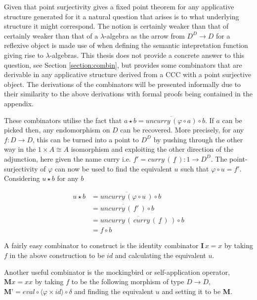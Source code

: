 Given that point surjectivity gives a fixed point theorem for any applicative
structure generated for it a natural question that arises is to what underlying
structure it might correspond. The notion is certainly weaker than that of
certainly weaker than that of a $\lambda$-algebra as the arrow from $D^{D}
\rightarrow D$ for a reflexive object is made use of when defining the semantic
intepretation function giving rise to $\lambda$-algebras. This thesis does not
provide a concrete answer to this question, see Section \ref{section:combin},
but provides some combinators that are derivable in any applicative structure
derived from a CCC with a point surjective object. The derivations of the
combinators will be presented informally due to their similarity to the above
derivations with formal proofs being contained in the appendix.

These combinators utilise the fact that $a \star b =
\overline{uncurry \, (\varphi \circ a)} \circ b$. If  $a$ can be picked
then, any endomorphism on $D$ can be recovered. More precisely, for any $f:
D \rightarrow D$, this can be turned into a point to $D^D$ by pushing through
the other way in the $1 \times A \cong A$ isomorphism and exploiting the other
direction of the adjunction, here given the name curry i.e. $f' = curry \, (
\,\underline{f} \,) : 1 \rightarrow D^D$. The point-surjectivity of $\varphi$
can now be used to find the equivalent $u$ such that $\varphi \circ u = f'$.
Considering $u \star b$ for any $b$

\begin{align*}
    u \star b &= \overline{uncurry \, (\varphi \circ u \, )} \circ b \\
    &= \overline{uncurry \, ( \, f' \, ) } \circ b \\
    &= \overline{uncurry \, ( \, curry \, ( \, \underline{f} \, ) \, )} \circ b \\
    &= f \circ b
\end{align*}


A fairly easy combinator to construct is the identity combinator $\textbf{I} \, x =
x$ by taking $f$ in the above construction to be $id$ and calculating the
equivalent $u$.

Another useful combinator is the mockingbird or self-application operator,
$\textbf{M} x = x x$ by taking $f$ to be the following morphism of type $D
\rightarrow D$, $\textbf{M'} = eval \circ \langle \varphi \times id \rangle \circ
\delta$ and finding the equivalent $u$ and setting it to be \textbf{M}.

